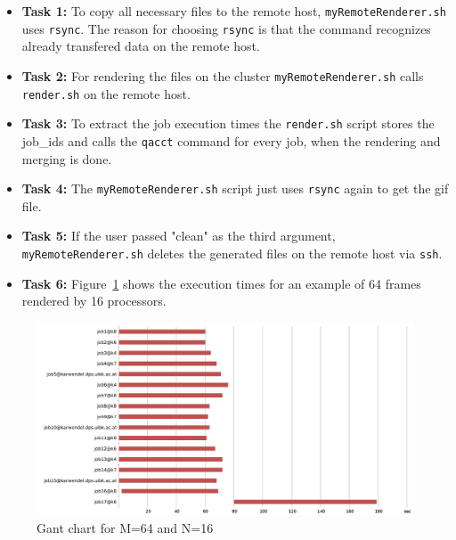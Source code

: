 \documentclass{article}
\begin{document}
\begin{itemize}
\item \textbf{Task 1:} To copy all necessary files to the remote host, \texttt{my\-Remote\-Renderer\-.sh} uses \texttt{rsync}. The reason for choosing \texttt{rsync} is that the command recognizes already transfered data on the remote host.
\item \textbf{Task 2:} For rendering the files on the cluster \texttt{myRemoteRenderer.sh} calls \texttt{render.sh} on the remote host.
\item \textbf{Task 3:} To extract the job execution times the \texttt{render.sh} script stores the job\_ids and calls the \texttt{qacct} command for every job, when the rendering and merging is done.
\item \textbf{Task 4:} The \texttt{myRemoteRenderer.sh} script just uses \texttt{rsync} again to get the gif file.
\item \textbf{Task 5:} If the user passed "clean" as the third argument, \texttt{myRemoteRenderer.sh} deletes the generated files on the remote host via \texttt{ssh}.
\item \textbf{Task 6:} Figure~\ref{fig:gant} shows the execution times for an example of 64 frames rendered by 16 processors.
\end{itemize}

\begin{figure}[htbp]
\begin{center}
\includegraphics[width=\textwidth]{gant.png}
\caption{Gant chart for M=64 and N=16}
\label{fig:gant}
\end{center}
\end{figure}

\end{document}
